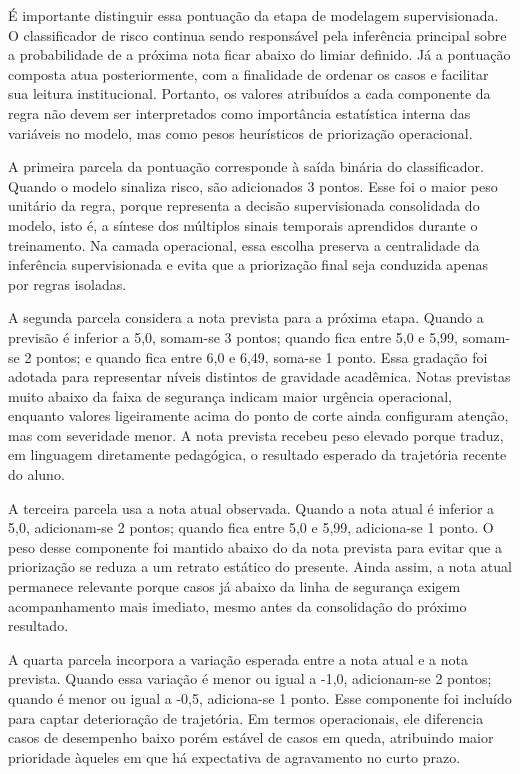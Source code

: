 \'E importante distinguir essa pontua\c{c}\~ao da etapa de modelagem supervisionada. O classificador de risco continua sendo respons\'avel pela infer\^encia principal sobre a probabilidade de a pr\'oxima nota ficar abaixo do limiar definido. J\'a a pontua\c{c}\~ao composta atua posteriormente, com a finalidade de ordenar os casos e facilitar sua leitura institucional. Portanto, os valores atribu\'idos a cada componente da regra n\~ao devem ser interpretados como import\^ancia estat\'istica interna das vari\'aveis no modelo, mas como pesos heur\'isticos de prioriza\c{c}\~ao operacional.

A primeira parcela da pontua\c{c}\~ao corresponde \`a sa\'ida bin\'aria do classificador. Quando o modelo sinaliza risco, s\~ao adicionados 3 pontos. Esse foi o maior peso unit\'ario da regra, porque representa a decis\~ao supervisionada consolidada do modelo, isto \'e, a s\'intese dos m\'ultiplos sinais temporais aprendidos durante o treinamento. Na camada operacional, essa escolha preserva a centralidade da infer\^encia supervisionada e evita que a prioriza\c{c}\~ao final seja conduzida apenas por regras isoladas.

A segunda parcela considera a nota prevista para a pr\'oxima etapa. Quando a previs\~ao \'e inferior a 5,0, somam-se 3 pontos; quando fica entre 5,0 e 5,99, somam-se 2 pontos; e quando fica entre 6,0 e 6,49, soma-se 1 ponto. Essa grada\c{c}\~ao foi adotada para representar n\'iveis distintos de gravidade acad\^emica. Notas previstas muito abaixo da faixa de seguran\c{c}a indicam maior urg\^encia operacional, enquanto valores ligeiramente acima do ponto de corte ainda configuram aten\c{c}\~ao, mas com severidade menor. A nota prevista recebeu peso elevado porque traduz, em linguagem diretamente pedag\'ogica, o resultado esperado da trajet\'oria recente do aluno.

A terceira parcela usa a nota atual observada. Quando a nota atual \'e inferior a 5,0, adicionam-se 2 pontos; quando fica entre 5,0 e 5,99, adiciona-se 1 ponto. O peso desse componente foi mantido abaixo do da nota prevista para evitar que a prioriza\c{c}\~ao se reduza a um retrato est\'atico do presente. Ainda assim, a nota atual permanece relevante porque casos j\'a abaixo da linha de seguran\c{c}a exigem acompanhamento mais imediato, mesmo antes da consolida\c{c}\~ao do pr\'oximo resultado.

A quarta parcela incorpora a varia\c{c}\~ao esperada entre a nota atual e a nota prevista. Quando essa varia\c{c}\~ao \'e menor ou igual a -1,0, adicionam-se 2 pontos; quando \'e menor ou igual a -0,5, adiciona-se 1 ponto. Esse componente foi inclu\'ido para captar deteriora\c{c}\~ao de trajet\'oria. Em termos operacionais, ele diferencia casos de desempenho baixo por\'em est\'avel de casos em queda, atribuindo maior prioridade \`aqueles em que h\'a expectativa de agravamento no curto prazo.


